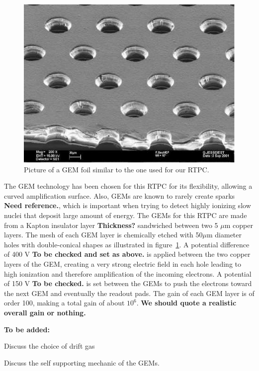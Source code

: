 \documentclass[twocolumn,showpacs,superscriptaddress,groupedaddress]{revtex4}
\begin{document}
\begin{figure}[tbp]
\centering
\includegraphics[scale=0.70]{fig/GEM_photo.jpg}
\caption{Picture of a GEM foil similar to the one used for our RTPC.} 
\label{fig:GEMs}
\end{figure}

The GEM technology has been chosen for this RTPC for its flexibility, 
allowing a curved amplification surface. Also, GEMs are known to rarely create 
sparks{\bf \color{red} Need reference.}, which is important when trying to 
detect highly ionizing slow nuclei that deposit large amount of energy. The 
GEMs for this RTPC are made from a Kapton insulator layer 
{\bf \color{red} Thickness?} sandwiched between two 5 $\mu$m copper
layers. The mesh of each GEM layer is chemically etched with 50$\mu$m diameter
holes with double-conical shapes as illustrated in figure~\ref{fig:GEMs}. A
potential difference of 400 V {\bf \color{red} To be checked and set as above.} 
is applied between the two copper layers of the
GEM, creating a very strong electric field in each hole leading to high ionization 
and therefore amplification of the incoming electrons. A 
potential of 150 V {\bf \color{red} To be checked.} 
is set between the GEMs to push the electrons toward the next GEM and eventually 
the readout pads. The gain of each GEM layer is of order 100, making a total gain 
of about $10^{6}$. {\bf \color{red} We should quote a realistic overall gain or nothing.}\\

{\bf \color{red} To be added:

Discuss the choice of drift gas

Discuss the self supporting mechanic of the GEMs.}
\end{document}
